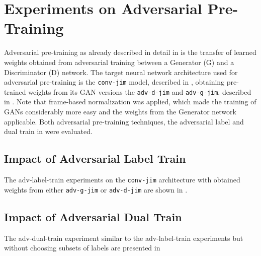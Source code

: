 
\section{Experiments on Adversarial Pre-Training}\label{sec:exp_adv}
\thesisStateNotReady
Adversarial pre-training as already described in detail in  is the transfer of learned weights obtained from adversarial training between a Generator (G) and a Discriminator (D) network.
The target neural network architecture used for adversarial pre-training is the \texttt{conv-jim} model, described in , obtaining pre-trained weights from its GAN versions the \texttt{adv-d-jim} and \texttt{adv-g-jim}, described in .
Note that frame-based normalization was applied, which made the training of GANs considerably more easy and the weights from the Generator network applicable.
Both adversarial pre-training techniques, the adversarial label and dual train in  were evaluated.



\subsection{Impact of Adversarial Label Train}
The adv-label-train experiments on the \texttt{conv-jim} architecture with obtained weights from either \texttt{adv-g-jim} or \texttt{adv-d-jim} are shown in .




\subsection{Impact of Adversarial Dual Train}
The adv-dual-train experiment similar to the adv-label-train experiments but without choosing subsets of labels are presented in 



